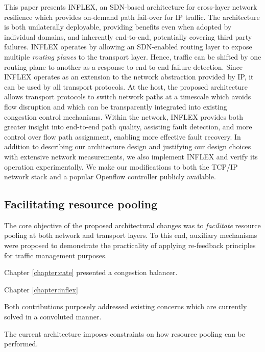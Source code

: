 {\COMMENT
This paper presents INFLEX, an \ac{SDN}-based architecture for cross-layer network resilience which provides on-demand path fail-over for \ac{IP} traffic. 
The architecture is both unilaterally deployable, providing benefits even when adopted by individual domains, and inherently end-to-end, potentially covering third party failures.
INFLEX operates by allowing an \ac{SDN}-enabled routing layer to expose multiple \emph{routing planes} to the transport layer. 
Hence, traffic can be shifted by one routing plane to another as a response to end-to-end failure detection.
Since INFLEX operates as an extension to the network abstraction provided by \ac{IP}, it can be used by all transport protocols.
At the host, the proposed architecture allows transport protocols to switch network paths at a timescale which avoids flow disruption and which can be transparently integrated into existing congestion control mechanisms.
Within the network, INFLEX provides both greater insight into end-to-end path quality, assisting fault detection, and more control over flow path assignment, enabling more effective fault recovery. 
In addition to describing our architecture design and justifying our design choices with extensive network measurements, we also implement INFLEX and verify its operation experimentally. 
We make our modifications to both the \ac{TCP}/\ac{IP} network stack and a popular Openflow controller \cite{pox} publicly available.
}

\subsection{Facilitating resource pooling}

The core objective of the proposed architectural changes was to \emph{facilitate} resource pooling at both network and transport layers.
To this end, auxiliary mechanisms were proposed to demonstrate the practicality of applying re-feedback principles for traffic management purposes.

Chapter \ref{chapter:cate} presented a congestion balancer.
\LOREM
\LOREM

Chapter \ref{chapter:inflex} 

Both contributions purposely addressed existing concerns which are currently solved in a convoluted manner.


The current architecture imposes constraints on how resource pooling can be performed.

